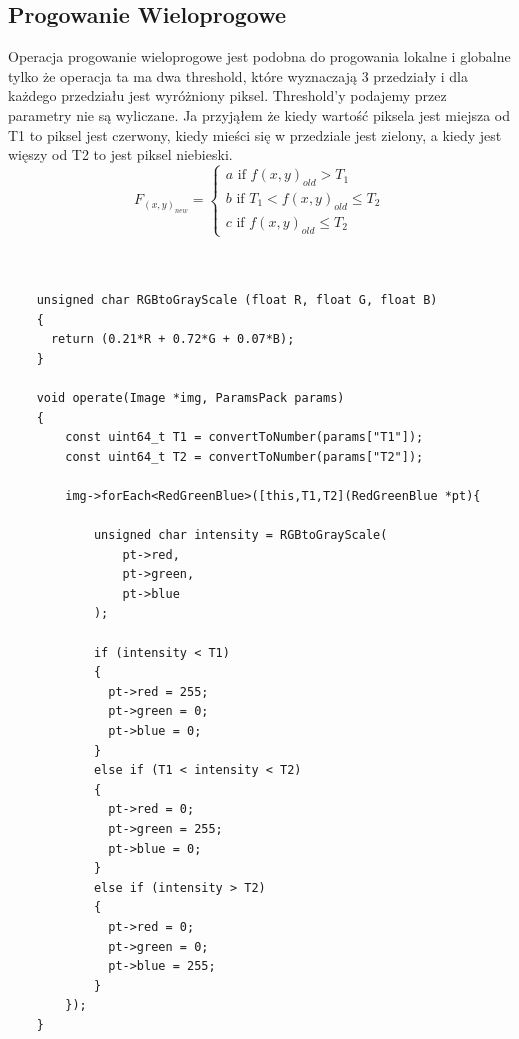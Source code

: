 \documentclass{article}
\begin{document}
\FloatBarrier
\subsection{Progowanie Wieloprogowe}
Operacja progowanie wieloprogowe jest podobna do progowania lokalne i globalne tylko że operacja ta ma dwa threshold, które wyznaczają 3 przedziały i dla każdego przedziału jest wyróżniony piksel. Threshold'y podajemy przez parametry nie są wyliczane. Ja przyjąłem że kiedy wartość piksela jest miejsza od T1 to piksel jest czerwony, kiedy mieści się w przedziale jest zielony, a kiedy jest więszy od T2 to jest piksel niebieski.
\begin{equation*}
F_(x,y)_{new} =  \begin{cases}a \mbox{ if } f(x,y)_{old} > T_{1} \\ b \mbox{ if } T_{1} < f(x,y)_{old} \leq T_{2} \\ c \mbox{ if } f(x,y)_{old} \leq T_{2}\end{cases}
\end{equation*}\\
\begin{Verbatim}[frame=single,label=Progowanie Wieloprogowe (Source Code)]

    unsigned char RGBtoGrayScale (float R, float G, float B)
    {
      return (0.21*R + 0.72*G + 0.07*B);
    }

    void operate(Image *img, ParamsPack params)
    {
        const uint64_t T1 = convertToNumber(params["T1"]);
        const uint64_t T2 = convertToNumber(params["T2"]);

        img->forEach<RedGreenBlue>([this,T1,T2](RedGreenBlue *pt){
        
            unsigned char intensity = RGBtoGrayScale(
            	pt->red, 
            	pt->green, 
            	pt->blue
            );
            
            if (intensity < T1)
            {
              pt->red = 255;
              pt->green = 0;
              pt->blue = 0;
            }
            else if (T1 < intensity < T2)
            {
              pt->red = 0;
              pt->green = 255;
              pt->blue = 0;
            }
            else if (intensity > T2)
            {
              pt->red = 0;
              pt->green = 0;
              pt->blue = 255;
            }
        });
    }
    
\end{Verbatim}
\end{document}
